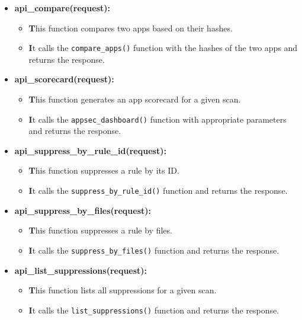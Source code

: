 \documentclass{report}
\begin{document}
\begin{itemize}
\begin{itemize}
\begin{itemize}
                  \item \textbf{api\_compare(request):}
                    \begin{itemize}
                      \item \textbf This function compares two apps based on their hashes.
                      \item \textbf It calls the \texttt{compare\_apps()} function with the hashes of the two apps and returns the response.
                    \end{itemize}
                  
                  \item \textbf{api\_scorecard(request):}
                    \begin{itemize}
                      \item \textbf This function generates an app scorecard for a given scan.
                      \item \textbf It calls the \texttt{appsec\_dashboard()} function with appropriate parameters and returns the response.
                    \end{itemize}
                  
                  \item \textbf{api\_suppress\_by\_rule\_id(request):}
                    \begin{itemize}
                      \item \textbf This function suppresses a rule by its ID.
                      \item \textbf It calls the \texttt{suppress\_by\_rule\_id()} function and returns the response.
                    \end{itemize}
                  
                  \item \textbf{api\_suppress\_by\_files(request):}
                    \begin{itemize}
                      \item \textbf This function suppresses a rule by files.
                      \item \textbf It calls the \texttt{suppress\_by\_files()} function and returns the response.
                    \end{itemize}
                  
                  \item \textbf{api\_list\_suppressions(request):}
                    \begin{itemize}
                      \item \textbf This function lists all suppressions for a given scan.
                      \item \textbf It calls the \texttt{list\_suppressions()} function and returns the response.
                    \end{itemize}
                  

\end{itemize}
\end{itemize}
\end{itemize}
\end{document}
